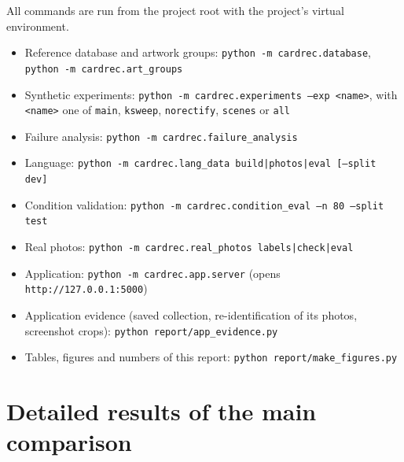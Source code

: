 All commands are run from the project root with the project's virtual environment.
\begin{itemize}
  \item Reference database and artwork groups: \texttt{python -m cardrec.database}, \texttt{python -m cardrec.art\_groups}
  \item Synthetic experiments: \texttt{python -m cardrec.experiments --exp <name>}, with \texttt{<name>} one of \texttt{main}, \texttt{ksweep}, \texttt{norectify}, \texttt{scenes} or \texttt{all}
  \item Failure analysis: \texttt{python -m cardrec.failure\_analysis}
  \item Language: \texttt{python -m cardrec.lang\_data build|photos|eval [--split dev]}
  \item Condition validation: \texttt{python -m cardrec.condition\_eval --n 80 --split test}
  \item Real photos: \texttt{python -m cardrec.real\_photos labels|check|eval}
  \item Application: \texttt{python -m cardrec.app.server} (opens \texttt{http://127.0.0.1:5000})
  \item Application evidence (saved collection, re-identification of its photos, screenshot crops): \texttt{python report/app\_evidence.py}
  \item Tables, figures and numbers of this report: \texttt{python report/make\_figures.py}
\end{itemize}

\section{Detailed results of the main comparison}


